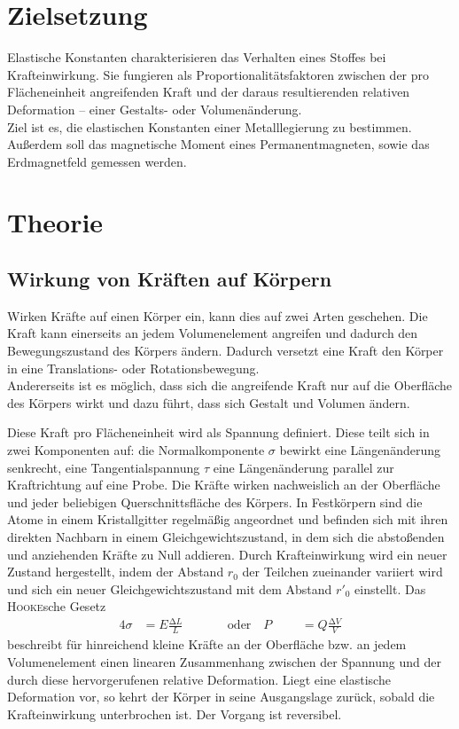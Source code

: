 \section{Zielsetzung}
Elastische Konstanten charakterisieren das Verhalten eines Stoffes bei Krafteinwirkung.
Sie fungieren als Proportionalitätsfaktoren zwischen der pro Flächeneinheit angreifenden Kraft und der daraus resultierenden relativen Deformation -- einer Gestalts- oder Volumenänderung. \\
Ziel ist es, die elastischen Konstanten einer Metalllegierung zu bestimmen. Außerdem soll das magnetische Moment eines Permanentmagneten, sowie das Erdmagnetfeld gemessen werden.
\section{Theorie}
\label{sec:Theorie}
\subsection{Wirkung von Kräften auf Körpern}
Wirken Kräfte auf einen Körper ein, kann dies auf zwei Arten geschehen.
Die Kraft kann einerseits an jedem Volumenelement angreifen und dadurch den Bewegungszustand des Körpers ändern.
Dadurch versetzt eine Kraft den Körper in eine Translations- oder Rotationsbewegung. \\
Andererseits ist es möglich, dass sich die angreifende Kraft nur auf die Oberfläche des Körpers wirkt und dazu führt, dass sich Gestalt und Volumen ändern. 

Diese Kraft pro Flächeneinheit wird als Spannung definiert. 
Diese teilt sich in zwei Komponenten auf: die Normalkomponente $\sigma$ bewirkt eine Längenänderung senkrecht, eine Tangentialspannung $\tau$ eine Längenänderung parallel zur Kraftrichtung auf eine Probe. 
Die Kräfte wirken nachweislich an der Oberfläche und jeder beliebigen Querschnittsfläche des Körpers. 
In Festkörpern sind die Atome in einem Kristallgitter regelmäßig angeordnet und befinden sich mit ihren direkten Nachbarn in einem Gleichgewichtszustand, in dem sich die abstoßenden und anziehenden Kräfte zu Null addieren. 
Durch Krafteinwirkung wird ein neuer Zustand hergestellt, indem der Abstand $r_0$ der Teilchen zueinander variiert wird und sich ein neuer Gleichgewichtszustand mit dem Abstand $r'_0$ einstellt.
Das \textsc{Hooke}sche Gesetz
\begin{alignat}{4}
\sigma&=E\frac{\mathup{\Delta}{L}}{L}\qquad &&\text{oder} \quad P&&&=Q\frac{\mathup{\Delta}{V}}{V}
\label{eq:hooke}
\end{alignat}
beschreibt für hinreichend kleine Kräfte an der Oberfläche bzw. an jedem Volumenelement einen linearen Zusammenhang zwischen der Spannung und der durch diese hervorgerufenen relative Deformation.
Liegt eine elastische Deformation vor, so kehrt der Körper in seine Ausgangslage zurück, sobald die Krafteinwirkung unterbrochen ist.
Der Vorgang ist reversibel. 
